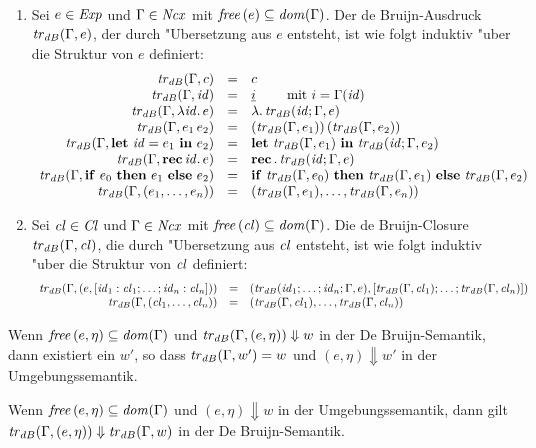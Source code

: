 \documentclass[12pt,fleqn,a4paper]{article}
\newcommand{\Cl}{\name{Cl}}
\newcommand{\cl}{\name{cl}}
\begin{document}
\begin{definition}["Ubersetzungsfunktion] \
  \begin{enumerate}
  \item Sei $e \in {\text{\it Exp\/}}$ und $\Gamma\in{\text{\it Ncx\/}}$ mit ${\text{\it free\/}}\,(e) \subseteq {\text{\it dom\/}}(\Gamma)$.
    Der de Bruijn-Ausdruck ${\text{\it tr\/}}_{dB}(\Gamma,e)$, der durch "Ubersetzung aus $e$ entsteht,
    ist wie folgt induktiv "uber die Struktur von $e$ definiert:
    \[\begin{array}{rcl}
      {\text{\it tr\/}}_{dB}(\Gamma,c) &=& c \\
      {\text{\it tr\/}}_{dB}(\Gamma,{\text{\it id\/}}) &=& \underline{i} \quad\quad \text{ mit } i = \Gamma({\text{\it id\/}}) \\
      {\text{\it tr\/}}_{dB}(\Gamma,\lambda {\text{\it id\/}}.\,e) &=& \lambda .\,{\text{\it tr\/}}_{dB}({\text{\it id\/}};\Gamma,e) \\
      {\text{\it tr\/}}_{dB}(\Gamma,e_1\,e_2) &=& ({\text{\it tr\/}}_{dB}(\Gamma,e_1))\,({\text{\it tr\/}}_{dB}(\Gamma,e_2)) \\
      {\text{\it tr\/}}_{dB}(\Gamma,\mathbf{let}\ {\text{\it id\/}} = e_1\ \mathbf{in}\ e_2) &=& \mathbf{let}\ {{\text{\it tr\/}}_{dB}(\Gamma,e_1)}\ \mathbf{in}\ {{\text{\it tr\/}}_{dB}({\text{\it id\/}};\Gamma,e_2)} \\
      {\text{\it tr\/}}_{dB}(\Gamma,\mathbf{rec}\,{\text{\it id\/}}.\,e) &=& \mathbf{rec}\,.\,{\text{\it tr\/}}_{dB}({\text{\it id\/}};\Gamma,e) \\
      {\text{\it tr\/}}_{dB}(\Gamma,\mathbf{if}\ e_0\ \mathbf{then}\ e_1\ \mathbf{else}\ e_2) &=& \mathbf{if}\ {\text{\it tr\/}}_{dB}(\Gamma,e_0)\ \mathbf{then}\ {\text{\it tr\/}}_{dB}(\Gamma,e_1)\ \mathbf{else}\ {\text{\it tr\/}}_{dB}(\Gamma,e_2) \\
      {\text{\it tr\/}}_{dB}(\Gamma,(e_1,\ldots,e_n)) &=& ({\text{\it tr\/}}_{dB}(\Gamma,e_1),\ldots,{\text{\it tr\/}}_{dB}(\Gamma,e_n)) \\
    \end{array}\]
  \item Sei $\cl \in \Cl$ und $\Gamma \in {\text{\it Ncx\/}}$ mit $\free{\cl} \subseteq \dom{\Gamma}$.
    Die de Bruijn-Closure $\trdB{\Gamma,\cl}$, die durch "Ubersetzung aus $\cl$ entsteht,
    ist wie folgt induktiv "uber die Struktur von $\cl$ definiert:
    \[\begin{array}{rcl}
      \trdB{\Gamma,(e,[\id_1:\cl_1;\ldots;\id_n:\cl_n])} &=& (\trdB{\id_1;\ldots;\id_n;\Gamma,e},[\trdB{\Gamma,\cl_1};\ldots;\trdB{\Gamma,\cl_n}]) \\
      \trdB{\Gamma,(\cl_1,\ldots,\cl_n)} &=& (\trdB{\Gamma,\cl_1},\ldots,\trdB{\Gamma,\cl_n}) \\
    \end{array}\]
  \end{enumerate}
\end{definition}

\begin{theorem}
  Wenn ${\text{\it free\/}}\,(e,\eta) \subseteq {\text{\it dom\/}}(\Gamma)$ und ${\text{\it tr\/}}_{dB}(\Gamma,(e,\eta)) \Downarrow w$ in der
  De Bruijn-Semantik, dann existiert ein $w'$, so dass ${\text{\it tr\/}}_{dB}(\Gamma,w') = w$ und
  $(e,\eta) \Downarrow w'$ in der Umgebungssemantik.
\end{theorem}

\begin{theorem}
  Wenn ${\text{\it free\/}}\,(e,\eta) \subseteq {\text{\it dom\/}}(\Gamma)$ und $(e,\eta) \Downarrow w$ in der Umgebungssemantik,
  dann gilt ${\text{\it tr\/}}_{dB}(\Gamma,(e,\eta)) \Downarrow {\text{\it tr\/}}_{dB}(\Gamma,w)$ in der De Bruijn-Semantik.
\end{theorem}
\end{document}
